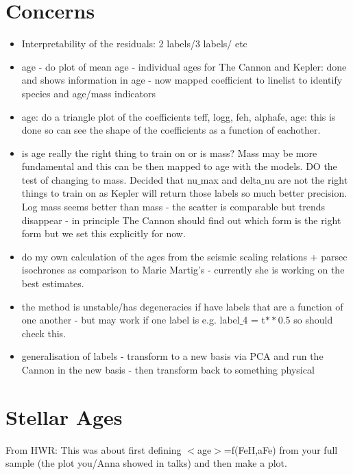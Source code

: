 \documentclass[11pt]{amsart}
\begin{document}
\begin{itemize}
\end{itemize} 


\section{Concerns}
\begin{itemize}
\item Interpretability of the residuals: 2 labels/3 labels/ etc
\item age - do plot of mean age - individual ages for The Cannon and Kepler: done and shows information in age - now mapped coefficient to linelist to identify species and age/mass indicators \\
\item age: do a triangle plot of the coefficients teff, logg, feh, alphafe, age: this is done so can see the shape of the coefficients as a function of eachother. \\ 
\item is age really the right thing to train on or is mass? Mass may be more fundamental and this can be then mapped to age with the models. DO the test of changing to mass. Decided that nu$\_$max and delta$\_$nu are not the right things to train on as Kepler will return those labels so much better precision. Log mass seems better than mass - the scatter is comparable but trends disappear - in principle The Cannon should find out which form is the right form but we set this explicitly for now. 
\item  do my own calculation of the ages from the seismic scaling relations + parsec isochrones as comparison to Marie Martig's - currently she is working on the best estimates. 
\item the method is unstable/has degeneracies if have labels that are a function of one another - but may work if one label is e.g. label$\_$4 = t$**$0.5 so should check this. 
\item generalisation of labels - transform to a new basis via PCA and run the Cannon in the new basis - then transform back to something physical 
\end{itemize} 

\section{Stellar Ages}

 From HWR: This was about first defining $<$age$>$=f(FeH,aFe) from your full
 sample (the plot you/Anna showed in talks) and
 then make a plot. 
 
\end{document}
